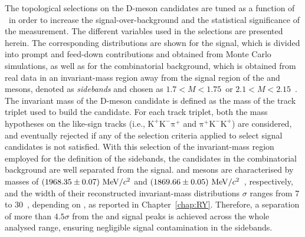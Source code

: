 The topological selections on the D-meson candidates are tuned as a function of \pt\ in order to increase the signal-over-background and the statistical significance of the measurement. The different variables used in the selections are presented herein. The corresponding distributions are shown for the signal, which is divided into prompt and feed-down contributions and obtained from Monte Carlo simulations, as well as for the combinatorial background, which is obtained from real data in an invariant-mass region away from the signal region of the \ds and \dpl mesons, denoted as \emph{sidebands} and chosen as $1.7<M<1.75$~\gevcc or $2.1<M<2.15$~\gevcc. The invariant mass of the D-meson candidate is defined as the mass of the track triplet used to build the candidate. For each track triplet, both the mass hypotheses on the like-sign tracks (i.e., $\mathrm{K^+K^-\pi^+}$ and $\mathrm{\pi^+K^-K^+}$) are considered, and eventually rejected if any of the selection criteria applied to select signal candidates is not satisfied. With this selection of the invariant-mass region employed for the definition of the sidebands, the candidates in the combinatorial background are well separated from the signal. \ds and \dpl mesons are characterised by masses of $(1968.35\pm0.07)~\mathrm{Me\kern-.1emV}/c^2$ and $(1869.66\pm0.05)~\mathrm{Me\kern-.1emV}/c^2$~\cite{pdg}, respectively, and the width of their reconstructed invariant-mass distributions $\sigma$ ranges from 7 to 30~\mevcc, depending on \pt, as reported in Chapter~\ref{chap:RY}. Therefore, a separation of more than $4.5\sigma$ from the \ds and \dpl signal peaks is achieved across the whole analysed \pt range, ensuring negligible signal contamination in the sidebands.

